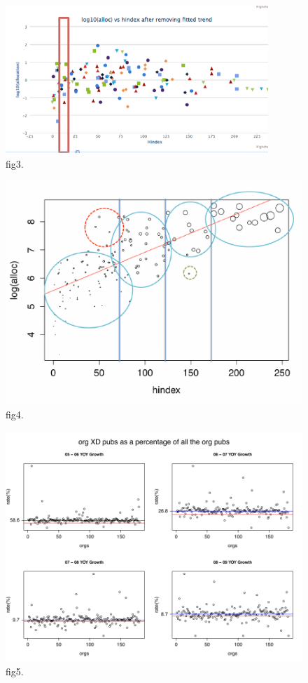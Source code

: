 \begin{figure}[htb]
  \centering
    \includegraphics[width=1.0\columnwidth]{images/fig3.pdf}
  \caption{fig3.}\label{F:fig3}
\end{figure}

\begin{figure}[htb]
  \centering
    \includegraphics[width=1.0\columnwidth]{images/fig4.pdf}
  \caption{fig4.}\label{F:fig4}
\end{figure}

\begin{figure}[htb]
  \centering
    \includegraphics[width=1.0\textwidth]{images/fig5.pdf}
  \caption{fig5.}\label{F:fig5}
\end{figure}

